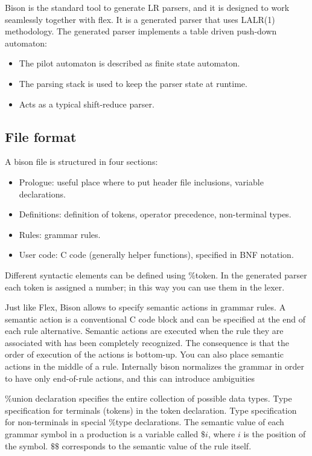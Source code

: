 \documentclass[12pt, a4paper]{report}
\begin{document}
        Bison is the standard tool to generate LR parsers, and it is designed to work seamlessly together with flex. It is a generated parser that uses LALR(1) methodology.
        The generated parser implements a table driven push-down automaton:
        \begin{itemize}
            \item The pilot automaton is described as finite state automaton.
            \item The parsing stack is used to keep the parser state at runtime.
            \item Acts as a typical shift-reduce parser.
        \end{itemize}

        \subsection{File format}
        A bison file is structured in four sections:
        \begin{itemize}
            \item Prologue: useful place where to put header file inclusions, variable declarations. 
            \item Definitions: definition of tokens, operator precedence, non-terminal types. 
            \item Rules: grammar rules. 
            \item User code: C code (generally helper functions), specified in BNF notation.
        \end{itemize}
        Different syntactic elements can be defined using $\%$token. In the generated parser each token is assigned a number; in this way you can use them in the lexer. 
        
        Just like Flex, Bison allows to specify semantic actions in grammar rules. A semantic action is a conventional C code block and can be specified at the end of 
        each rule alternative. Semantic actions are executed when the rule they are associated with has been completely recognized. The consequence is that the order of 
        execution of the actions is bottom-up. You can also place semantic actions in the middle of a rule. Internally bison normalizes the grammar in order to have only
        end-of-rule actions, and this can introduce ambiguities
        
        $\%$union declaration specifies the entire collection of possible data types. Type specification for terminals (tokens) in the token declaration. Type 
        specification for non-terminals in special $\%$type declarations. The semantic value of each grammar symbol in a production is a variable called $\$i$, where 
        $i$ is the position of the symbol. $\$\$$ corresponds to the semantic value of the rule itself. 
\end{document}

